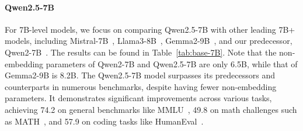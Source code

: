 \documentclass{article}
\begin{document}
\paragraph{Qwen2.5-7B}
For 7B-level models, we focus on comparing Qwen2.5-7B with other leading 7B+ models, including Mistral-7B~\citep{mistral}, Llama3-8B~\citep{llama3}, Gemma2-9B~\citep{gemma2}, and our predecessor, Qwen2-7B~\citep{qwen2}.
The results can be found in Table~\ref{tab:base-7B}. Note that the non-embedding parameters of Qwen2-7B and Qwen2.5-7B are only 6.5B, while that of Gemma2-9B is 8.2B.
The Qwen2.5-7B model surpasses its predecessors and counterparts in numerous benchmarks, despite having fewer non-embedding parameters. It demonstrates significant improvements across various tasks, achieving 74.2 on general benchmarks like MMLU~\citep{mmlu}, 49.8 on math challenges such as MATH~\citep{math}, and 57.9 on coding tasks like HumanEval~\citep{humaneval}.
\end{document}
